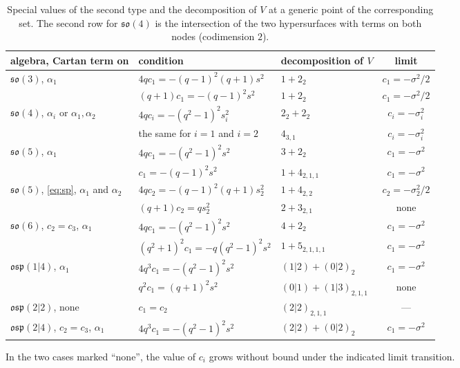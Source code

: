 \documentclass[12pt,a4paper]{article}
\newcommand{\so}{\mathfrak{so}}
\newcommand{\osp}{\mathfrak{osp}}
\begin{document}
\begin{table}[H]
\centering\small
\setlength{\tabcolsep}{4pt}
\begin{tabular}{@{}lllc@{}}
\toprule
algebra, Cartan term on & condition & decomposition of $V$ & limit\\
\midrule
$\so(3)$, $\alpha_1$ & $4qc_1=-(q-1)^2(q+1)s^2$ & $1+2_{2}$ & $c_1=-\sigma^2/2$\\
 & $(q+1)c_1=-(q-1)^2s^2$ & $1+2_{2}$ & $c_1=-\sigma^2/2$\\
$\so(4)$, $\alpha_i$ or $\alpha_1,\alpha_2$ & $4qc_i=-(q^2-1)^2s_i^2$ & $2_{2}+2_{2}$ & $c_i=-\sigma_i^2$\\
 & the same for $i=1$ and $i=2$ & $4_{3,1}$ & $c_i=-\sigma_i^2$\\
$\so(5)$, $\alpha_1$ & $4qc_1=-(q^2-1)^2s^2$ & $3+2_{2}$ & $c_1=-\sigma^2$\\
 & $c_1=-(q-1)^2s^2$ & $1+4_{2,1,1}$ & $c_1=-\sigma^2$\\
$\so(5)$, \eqref{eq:sp}, $\alpha_1$ and $\alpha_2$ & $4qc_2=-(q-1)^2(q+1)s_2^2$ & $1+4_{2,2}$ & $c_2=-\sigma_2^2/2$\\
 & $(q+1)c_2=qs_2^2$ & $2+3_{2,1}$ & none\\
$\so(6)$, $c_2=c_3$, $\alpha_1$ & $4qc_1=-(q^2-1)^2s^2$ & $4+2_{2}$ & $c_1=-\sigma^2$\\
 & $(q^2+1)^2c_1=-q(q^2-1)^2s^2$ & $1+5_{2,1,1,1}$ & $c_1=-\sigma^2$\\
$\osp(1|4)$, $\alpha_1$ & $4q^3c_1=-(q^2-1)^2s^2$ & $(1|2)+(0|2)_{2}$ & $c_1=-\sigma^2$\\
 & $q^2c_1=(q+1)^2s^2$ & $(0|1)+(1|3)_{2,1,1}$ & none\\
$\osp(2|2)$, none & $c_1=c_2$ & $(2|2)_{2,1,1}$ & ---\\
$\osp(2|4)$, $c_2=c_3$, $\alpha_1$ & $4q^3c_1=-(q^2-1)^2s^2$ & $(2|2)+(0|2)_{2}$ & $c_1=-\sigma^2$\\
\bottomrule
\end{tabular}
\caption{Special values of the second type and the decomposition of $V$ at a generic point of the corresponding set. The second row for
$\so(4)$ is the intersection of the two hypersurfaces with terms on both nodes (codimension $2$).}\label{t:typeII}
\end{table}

In the two cases marked ``none'', the value of $c_i$ grows without bound under the indicated limit transition.
\end{document}
